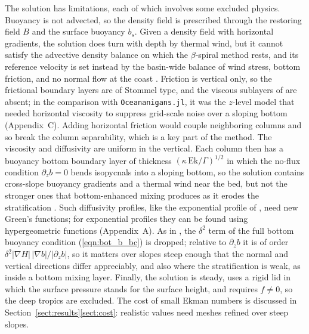 \documentclass{ametsocV6.2}
\begin{document}
The solution has limitations, each of which involves some excluded physics.
Buoyancy is not advected, so the density field is prescribed through the restoring field $B$ and the surface buoyancy $b_s$.
Given a density field with horizontal gradients, the solution does turn with depth by thermal wind, but it cannot satisfy the advective density balance on which the $\beta$-spiral method rests, and its reference velocity is set instead by the basin-wide balance of wind stress, bottom friction, and no normal flow at the coast \citep{stommel&schott77,schott&stommel78}.
Friction is vertical only, so the frictional boundary layers are of Stommel type, and the viscous sublayers of \citet{munk50} are absent; in the comparison with \texttt{Oceananigans.jl}, it was the $z$-level model that needed horizontal viscosity to suppress grid-scale noise over a sloping bottom (Appendix~C). Adding horizontal friction would couple neighboring columns and so break the column separability, which is a key part of the method.
The viscosity and diffusivity are uniform in the vertical.
Each column then has a buoyancy bottom boundary layer of thickness $(\kappa\,\mathrm{Ek}/\Gamma)^{1/2}$ in which the no-flux condition $\partial_z b = 0$ bends isopycnals into a sloping bottom, so the solution contains cross-slope buoyancy gradients and a thermal wind near the bed, but not the stronger ones that bottom-enhanced mixing produces as it erodes the stratification \citep{peterson&callies23,peterson&callies26}.
Such diffusivity profiles, like the exponential profile of \citet{peterson&callies26}, need new Green's functions; for exponential profiles they can be found using hypergeometric functions (Appendix~A).
As in \citet{peterson&callies26}, the $\delta^2$ term of the full bottom buoyancy condition (\ref{eqn:bot_b_bc}) is dropped; relative to $\partial_z b$ it is of order $\delta^2 |\nabla H| \, |\nabla b| / |\partial_z b|$, so it matters over slopes steep enough that the normal and vertical directions differ appreciably, and also where the stratification is weak, as inside a bottom mixing layer.
Finally, the solution is steady, uses a rigid lid in which the surface pressure stands for the surface height, and requires $f \neq 0$, so the deep tropics are excluded.
The cost of small Ekman numbers is discussed in Section~\ref{sect:results}\ref{sect:cost}: realistic values need meshes refined over steep slopes.
\end{document}

